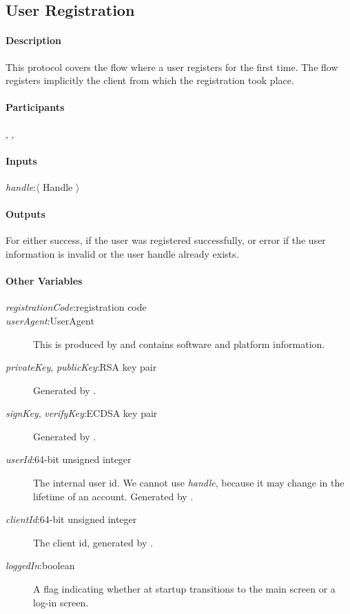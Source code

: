 \documentclass[a4paper,10pt,draft]{article}
\newcommand{\handle}{\emph{handle}}
\newcommand{\registrationCode}{\emph{registrationCode}}
\newcommand{\userAgent}{\emph{userAgent}}
\newcommand{\privateKey}{\emph{privateKey}}
\newcommand{\publicKey}{\emph{publicKey}}
\newcommand{\signKey}{\emph{signKey}}
\newcommand{\verifyKey}{\emph{verifyKey}}
\newcommand{\userId}{\emph{userId}}
\newcommand{\clientId}{\emph{clientId}}
\newcommand{\loggedIn}{\emph{loggedIn}}
\begin{document}
\subsection{User Registration}

\paragraph{Description}
This protocol covers the flow where a user registers for the first time. The flow registers implicitly the client from which the registration took place.

\paragraph{Participants} \Server{}, \Client{}, \User{}

\paragraph{Inputs}
\SpecialItem
\begin{description}
 \item[\handle{}:$\langle$ Handle $\rangle$]
\end{description}

\paragraph{Outputs}
For \Client{} either success, if the user was registered successfully, or error if the user information is invalid or the user handle already exists.

\paragraph{Other Variables}
\SpecialItem
\begin{description}
 \item[\registrationCode{}:registration code]
 \item[\userAgent{}:UserAgent] This is produced by \Client{} and contains software and platform information.
 \item[\privateKey{}, \publicKey{}:RSA key pair] Generated by \Client{}.
 \item[\signKey{}, \verifyKey{}:ECDSA key pair] Generated by \Client{}.
 \item[\userId{}:64-bit unsigned integer] The internal user id. We cannot use \handle{}, because it may change in the lifetime of an account. Generated by \Server{}.
 \item[\clientId{}:64-bit unsigned integer] The client id, generated by \Server{}.
 \item[\loggedIn{}:boolean] A flag indicating whether at \Client{} startup \Client{} transitions to the main screen or a log-in screen.
\end{description}
\end{document}
